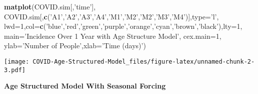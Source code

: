 \documentclass[
]{article}
\newenvironment{Shaded}{\begin{snugshade}}{\end{snugshade}}
\newcommand{\DataTypeTok}[1]{\textcolor[rgb]{0.13,0.29,0.53}{#1}}
\newcommand{\DecValTok}[1]{\textcolor[rgb]{0.00,0.00,0.81}{#1}}
\newcommand{\KeywordTok}[1]{\textcolor[rgb]{0.13,0.29,0.53}{\textbf{#1}}}
\newcommand{\NormalTok}[1]{#1}
\newcommand{\StringTok}[1]{\textcolor[rgb]{0.31,0.60,0.02}{#1}}
\begin{document}
\begin{Shaded}
\begin{Highlighting}[]
\KeywordTok{matplot}\NormalTok{(COVID.sim[,}\StringTok{'time'}\NormalTok{], COVID.sim[,}\KeywordTok{c}\NormalTok{(}\StringTok{'A1'}\NormalTok{,}\StringTok{'A2'}\NormalTok{,}\StringTok{'A3'}\NormalTok{,}\StringTok{'A4'}\NormalTok{,}\StringTok{'M1'}\NormalTok{,}\StringTok{'M2'}\NormalTok{,}\StringTok{'M2'}\NormalTok{,}\StringTok{'M3'}\NormalTok{,}\StringTok{'M4'}\NormalTok{)],}\DataTypeTok{type=}\StringTok{'l'}\NormalTok{, }
        \DataTypeTok{lwd=}\DecValTok{1}\NormalTok{,}\DataTypeTok{col=}\KeywordTok{c}\NormalTok{(}\StringTok{'blue'}\NormalTok{,}\StringTok{'red'}\NormalTok{,}\StringTok{'green'}\NormalTok{,}\StringTok{'purple'}\NormalTok{,}\StringTok{'orange'}\NormalTok{,}\StringTok{'cyan'}\NormalTok{,}\StringTok{'brown'}\NormalTok{,}\StringTok{'black'}\NormalTok{),}\DataTypeTok{lty=}\DecValTok{1}\NormalTok{, }\DataTypeTok{main=}\StringTok{'Incidence Over 1 Year with Age Structure Model'}\NormalTok{,         }\DataTypeTok{cex.main=}\DecValTok{1}\NormalTok{, }\DataTypeTok{ylab=}\StringTok{'Number of People'}\NormalTok{,}\DataTypeTok{xlab=}\StringTok{'Time (days)'}\NormalTok{)}
\end{Highlighting}
\end{Shaded}

\texttt{[image: COVID-Age-Structured-Model\_files/figure-latex/unnamed-chunk-2-3.pdf]}

\textbf{Age Structured Model With Seasonal Forcing}
\end{document}
